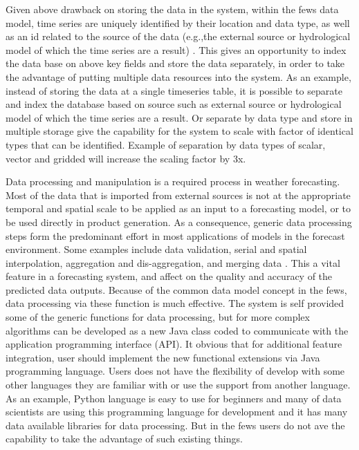 \documentclass[a4paper,oneside,12pt]{report}
\begin{document}
Given above drawback on storing the data in the system, within the \acrshort{fews} data model, time series are uniquely identified by their location and data type, as well as an id related to the source of the data (e.g.,the external source or hydrological model of which the time series are a result) \cite{Werner2013TheSystem}. This gives an opportunity to index the data base on above key fields and store the data separately, in order to take the advantage of putting multiple data resources into the system. As an example, instead of storing the data at a single timeseries table, it is possible to separate and index the database based on source such as external source or hydrological model of which the time series are a result. Or separate by data type and store in multiple storage give the capability for the system to scale with factor of identical types that can be identified. Example of separation by data types of scalar, vector and gridded will increase the scaling factor by 3x.

Data processing and manipulation is a required process in weather forecasting. Most of the data that is imported from external sources is not at the appropriate temporal and spatial scale to be applied as an input to a forecasting model, or to be used directly in product generation. As a consequence, generic data processing steps form the predominant effort in most applications of models in the forecast environment. Some examples include data validation, serial and spatial interpolation, aggregation and dis-aggregation, and merging data \cite{Werner2013TheSystem}. This a vital feature in a forecasting system, and affect on the quality and accuracy of the predicted data outputs. Because of the common data model concept in the \acrshort{fews}, data processing via these function is much effective. The system is self provided some of the generic functions for data processing, but for more complex algorithms can be developed as a new Java class coded to communicate with the application programming interface (API). It obvious that for additional feature integration, user should implement the new functional extensions via Java programming language. Users does not have the flexibility of develop with some other languages they are familiar with or use the support from another language. As an example, Python language is easy to use for beginners and many of data scientists are using this programming language for development and it has many data available libraries for data processing. But in the \acrshort{fews} users do not ave the capability to take the advantage of such existing things.
\end{document}
